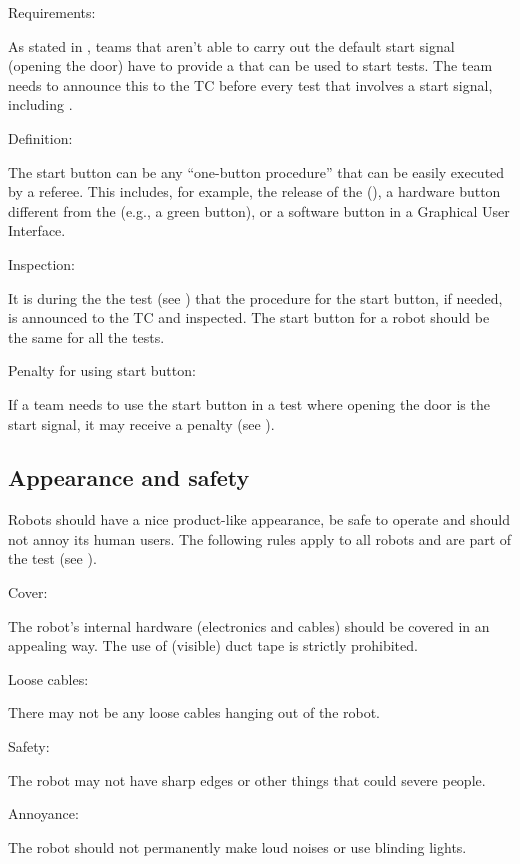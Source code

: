 \begin{enumerate}
  {\bf\item Requirements:} As stated in , teams that aren't able to carry out the default start signal (opening the door) have to provide a  that can be used to start tests. The team needs to announce this to the TC before every test that involves a start signal, including .
  {\bf\item Definition:} The start button can be any ``one-button procedure'' that can be easily executed by a referee.  This includes, for example, the release of the  (), a hardware button different from the  (e.g., a green button), or a software button in a Graphical User Interface. 
  {\bf\item Inspection:} It is during the the  test (see ) that the procedure for the start button, if needed, is announced to the TC and inspected. The start button for a robot should be the same for all the tests.
  {\bf\item Penalty for using start button:} If a team needs to use the start button in a test where opening the door is the start signal, it may receive a penalty (see ).
\end{enumerate}



\subsection{Appearance and safety}\label{rule:roobt_appearance}

Robots should have a nice product-like appearance, be safe to operate and should not annoy its human users.
The following rules apply to all robots and are part of the  test (see ). 
\begin{enumerate}
{\bf\item Cover:} The robot's internal hardware (electronics and cables) should be covered in an appealing way.
The use of (visible) duct tape is strictly prohibited.
{\bf\item Loose cables:} There may not be any loose cables hanging out of the robot. 
{\bf\item Safety:} The robot may not have sharp edges or other things that could severe people.
{\bf\item Annoyance:} The robot should not permanently make loud noises or use blinding lights.
\end{enumerate}




